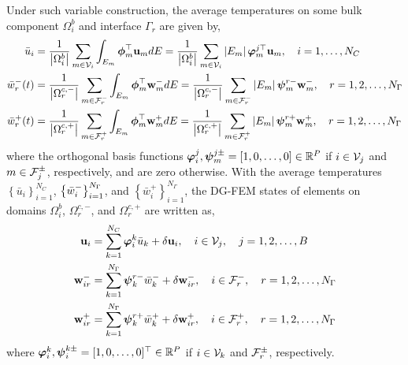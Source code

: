 Under such variable construction, the average temperatures on some bulk component $\Omega_i^b$ and interface $\Gamma_r$ are given by,
\begin{subequations}
    \begin{align}
        \bar{u}_i &= \frac{1}{\left|\Omega_i^{b}\right|}\sum_{m\in\mathcal{V}_i}\int_{E_m} \boldsymbol{\phi}_m^\top\mathbf{u}_m dE = \frac{1}{\left|\Omega_i^b\right|}\sum_{m\in\mathcal{V}_i}\left|E_m\right|\boldsymbol{\varphi}_m^{j\top}\mathbf{u}_m, \quad i=1,\ldots,N_{C}\\
        \bar{w}_r^{-}(t) &= \frac{1}{\left|\Omega_r^{c,-}\right|}\sum_{m\in\mathcal{F}_r^-}\int_{E_m} \boldsymbol{\phi}_m^\top\mathbf{w}^{-}_m dE = \frac{1}{\left|\Omega_r^{c,-}\right|}\sum_{m\in\mathcal{F}_r^{-}}\left|E_m\right|\boldsymbol{\psi}_m^{r-}\mathbf{w}^{-}_m, \quad r=1,2,\dots,N_{\Gamma}\\
        \bar{w}_r^{+}(t) &= \frac{1}{\left|\Omega_r^{c,+}\right|}\sum_{m\in\mathcal{F}_r^+}\int_{E_m} \boldsymbol{\phi}_m^\top\mathbf{w}^{+}_m dE = \frac{1}{\left|\Omega_r^{c,+}\right|}\sum_{m\in\mathcal{F}_r^{+}}\left|E_m\right|\boldsymbol{\psi}_m^{r+}\mathbf{w}_m^{+},\quad r=1,2,\dots,N_{\Gamma}
    \end{align}
\end{subequations}
where the orthogonal basis functions $\boldsymbol{\varphi}_i^j,\boldsymbol{\psi}_m^{j\pm}=\left[1,0,\dots,0\right]\in\mathbb{R}^{P}$ if $i\in\mathcal{V}_j$ and $m\in\mathcal{F}_j^{\pm}$, respectively, and are zero otherwise. With the average temperatures $\left\{\bar{u}_i\right\}_{i=1}^{N_C}$, $\left\{\bar{w}_i^{-}\right\}_{i=1}^{N_{\Gamma}}$, and $\left\{\bar{w}_i^{+}\right\}_{i=1}^{N_{\Gamma}}$, the DG-FEM states of elements on domains $\Omega_i^b$, $\Omega_r^{c,-}$, and $\Omega_r^{c,+}$ are written as,
\begin{subequations}
    \begin{align}
        \mathbf{u}_i &= \sum_{k=1}^{N_C}\boldsymbol{\varphi}_i^k\bar{u}_k + \delta\mathbf{u}_i,\quad i\in\mathcal{V}_j,\quad j=1,2,\dots,B\label{eqn_bulk_element_states}\\
        \mathbf{w}_{ir}^{-} &= \sum_{k=1}^{N_{\Gamma}}\boldsymbol{\psi}_k^{r-}\bar{w}_k^{-} + \delta\mathbf{w}_{ir}^{-},\quad i\in\mathcal{F}_r^{-},\quad r=1,2,\dots,N_{\Gamma}\label{eqn_negative_element_states}\\
        \mathbf{w}_{ir}^{+} &= \sum_{k=1}^{N_{\Gamma}}\boldsymbol{\psi}_k^{r+}\bar{w}_k^{+} + \delta\mathbf{w}_{ir}^{+},\quad i\in\mathcal{F}_r^{+},\quad r=1,2,\dots,N_{\Gamma}\label{eqn_positive_element_states}
    \end{align}
\end{subequations}
\noindent where $\boldsymbol{\varphi}_i^{k},\boldsymbol{\psi}_i^{k\pm} = [1,0,\dots,0]^\top\in\mathbb{R}^{P}$ if $i\in\mathcal{V}_k$ and $\mathcal{F}_r^{\pm}$, respectively.

